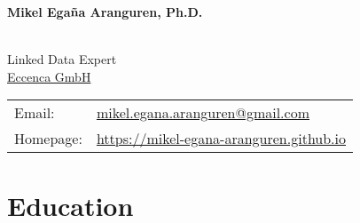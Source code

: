 \documentclass[11pt,fullpage]{article}
\newcommand{\etc}{\emph{etc.}}
\def\name{Mikel Ega\~na Aranguren, Ph.D.}
\begin{document}


\centerline{\Large \bf \name}

\vspace{0.25in}

\begin{minipage}{0.50\linewidth}
~\\
    Linked Data Expert \\
    \href{https://www.eccenca.com}{Eccenca GmbH} \\




\end{minipage}
\begin{minipage}{0.50\linewidth}
  \begin{tabular}{ll}
    Email: & \href{mailto:mikel.egana.aranguren@gmail.com}{mikel.egana.aranguren@gmail.com} \\
    Homepage: & \href{https://mikel-egana-aranguren.github.io}{https://mikel-egana-aranguren.github.io}

  \end{tabular}
\end{minipage}

\section*{Education}
\end{document}
